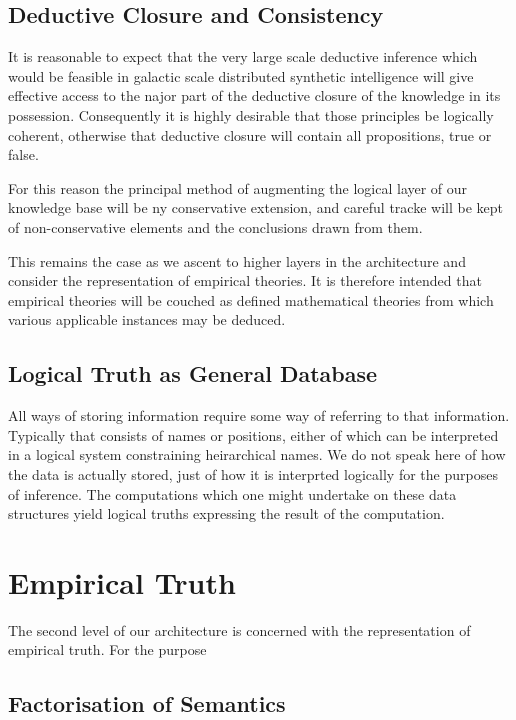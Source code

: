 \documentclass[10pt,titlepage]{book}
\begin{document}
\subsection{Deductive Closure and Consistency}

It is reasonable to expect that the very large scale deductive inference which would be feasible in galactic scale distributed synthetic intelligence will give effective access to the najor part of the deductive closure of the knowledge in its possession.
Consequently it is highly desirable that those principles be logically coherent, otherwise that deductive closure will contain all propositions, true or false.

For this reason the principal method of augmenting the logical layer of our knowledge base will be ny conservative extension, and careful tracke will be kept of non-conservative elements and the conclusions drawn from them.

This remains the case as we ascent to higher layers in the architecture and consider the representation of empirical theories.
It is therefore intended that empirical theories will be couched as defined mathematical theories from which various applicable instances may be deduced.

\subsection{Logical Truth as General Database}

All ways of storing information require some way of referring to that information.
Typically that consists of names or positions, either of which can be interpreted in a logical system constraining heirarchical names.
We do not speak here of how the data is actually stored, just of how it is interprted logically for the purposes of inference.
The computations which one might undertake on these data structures yield logical truths expressing the result of the computation.


\section{Empirical Truth}

The second level of our architecture is concerned with the representation of empirical truth.
For the purpose


\subsection{Factorisation of Semantics}
\end{document}
